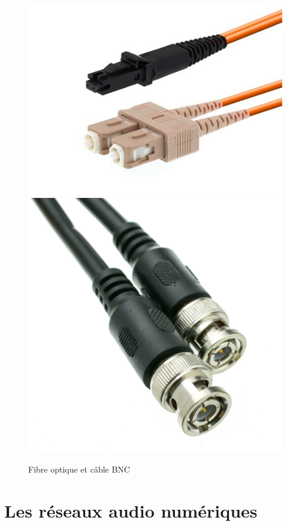 \documentclass[
]{book}
\begin{document}
\begin{figure}

{\centering \includegraphics{_resources/bitmap/plug/fibre} \includegraphics{_resources/bitmap/plug/bnc} 

}

\caption{Fibre optique et câble BNC}\label{fig:unnamed-chunk-33}
\end{figure}

\hypertarget{les-ruxe9seaux-audio-numuxe9riques}{%
\section{Les réseaux audio numériques}\label{les-ruxe9seaux-audio-numuxe9riques}}
\end{document}
